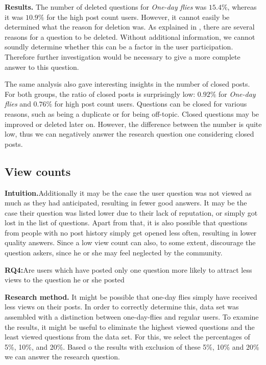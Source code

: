 \documentclass[conference]{IEEEtran}
\newcommand\odf{\emph{One-day flies}\xspace}
\begin{document}
\textbf{Results.} The number of deleted questions for \odf was $15.4\%$,
whereas it was $10.9\%$ for the high post count users. However, it cannot
easily be determined what the reason for deletion was. As explained in
\cite{correa2014chaff}, there are several reasons for a question to be deleted.
Without additional information, we cannot soundly determine whether this can be 
a factor in the user participation. Therefore further investigation
would be necessary to give a more complete answer to this question.
 
The same analysis also gave interesting insights in the number of closed posts.
For both groups, the ratio of closed posts is surprisingly low: $0.92\%$ for
\odf and $0.76\%$ for high post count users. Questions can be closed
for various reasons, such as being a duplicate or for being off-topic. Closed
questions may be improved or deleted later on. However, the difference between
the number is quite low, thus we can negatively answer the research question
one considering closed posts. 



\subsection{View counts}

\textbf{Intuition.}Additionally it may be the case the user question was not viewed as much as
they had anticipated, resulting in fewer good answers. It may be the case their
question was listed lower due to their lack of reputation, or simply got lost
in the list of questions. Apart from that, it is also possible that questions
from people with no post history simply get opened less often, resulting in
lower quality answers. Since a low view count can also, to some extent,
discourage the question askers, since he or she may feel neglected by the
community. 
 
\textbf{RQ4:}Are users which have posted only one question more likely to attract
less views to the question he or she posted
 
\textbf{Research method.} It might be possible that one-day flies simply have received less views on
their posts.  In order to correctly determine this, data set was assembled with
a distinction between one-day-flies and regular users. To examine the results,
it might be useful to eliminate the highest viewed questions and the least
viewed questions  from the data set. For this, we select the percentages of
5\%, 10\%, and 20\%. Based o the results with exclusion of these 5\%, 10\% and
20\% we can answer the research question. 
\end{document}
